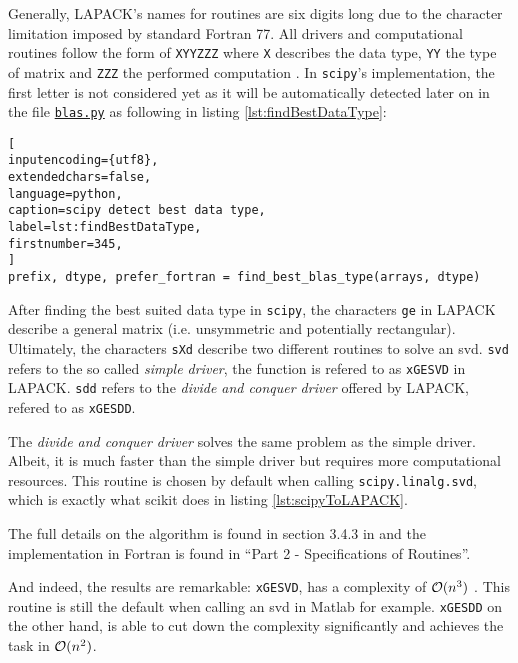 Generally, LAPACK's names for routines are six digits long due to the character limitation imposed by standard Fortran 77.
All drivers and computational routines follow the form of \texttt{XYYZZZ} where \texttt{X} describes the data type, \texttt{YY} the type of matrix and \texttt{ZZZ} the performed computation \cite{anderson1999lapack}.
In \texttt{scipy}'s implementation, the first letter is not considered yet as it will be automatically detected later on in the file \href{\scipyvIxVIIxII{blas}}{\texttt{blas.py}} as following in listing \ref{lst:findBestDataType}:

\begin{lstlisting}[
inputencoding={utf8}, 
extendedchars=false, 
language=python, 
caption=scipy detect best data type, 
label=lst:findBestDataType,
firstnumber=345,
]
prefix, dtype, prefer_fortran = find_best_blas_type(arrays, dtype)
\end{lstlisting}

After finding the best suited data type in \texttt{scipy}, the characters \texttt{ge} in LAPACK describe a general matrix (i.e. unsymmetric and potentially rectangular).
Ultimately, the characters \texttt{sXd} describe two different routines to solve an \gls{svd}.
\texttt{svd} refers to the so called \emph{simple driver}, the function is refered to as \texttt{xGESVD} in LAPACK.
\texttt{sdd} refers to the \emph{divide and conquer driver} offered by LAPACK, refered to as \texttt{xGESDD}.
\medskip

The \emph{divide and conquer driver} solves the same problem as the simple driver.
Albeit, it is much faster than the simple driver but requires more computational resources.
This routine is chosen by default when calling \texttt{scipy.linalg.svd}, which is exactly what \gls{scikit} does in listing \ref{lst:scipyToLAPACK}.

The full details on the algorithm is found in section 3.4.3 in  \cite{anderson1999lapack} and the implementation in Fortran is found in ``Part 2 - Specifications of Routines''.
\bigskip

And indeed, the results are remarkable: \texttt{xGESVD}, has a complexity of $\mathcal{O}(n^3)$ \cite{wright2001large}.
This routine is still the default when calling an \gls{svd} in Matlab for example.
\texttt{xGESDD} on the other hand, is able to cut down the complexity significantly and achieves the task in $\mathcal{O}(n^2)$\cite{anderson1999lapack}.


